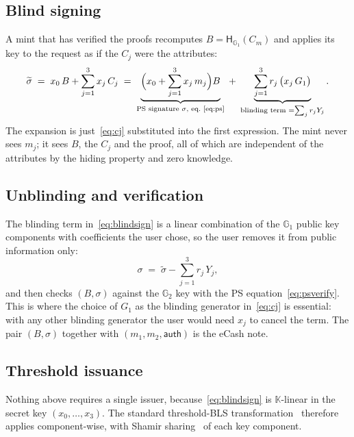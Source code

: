 \documentclass[10pt,a5paper]{article}
\newcommand{\K}[1]{#1}                      %
\newcommand{\Go}[1]{#1}                     %
\newcommand{\K}[1]{{\color{ScalarCol}#1}}   %
\newcommand{\Go}[1]{{\color{GoneCol}#1}}    %
\newcommand{\F}{\mathbb{K}}
\newcommand{\GG}[1]{\mathbb{G}_{#1}}
\newcommand{\Hg}{\mathsf{H}_{\GG{1}}}
\newcommand{\auth}{\mathsf{auth}}
\begin{document}
\subsection{Blind signing}
\label{sec:blindsign}

A mint that has verified the proofs recomputes $\Go{B} = \Hg(\Go{C_m})$ and
applies its key to the request as if the $\Go{C_j}$ were the attributes:
\begin{equation}
  \Go{\widetilde{\sigma}}
  \;=\; \K{x_0}\,\Go{B} + \sum_{j=1}^{3} \K{x_j}\,\Go{C_j}
  \;=\; \underbrace{\Bigl(\K{x_0} + \sum_{j=1}^{3} \K{x_j}\,\K{m_j}\Bigr)\Go{B}}_{\text{PS signature } \Go{\sigma}\text{, eq.~\eqref{eq:ps}}}
      \;+\; \underbrace{\sum_{j=1}^{3} \K{r_j}\,\bigl(\K{x_j}\,\Go{G_1}\bigr)}_{\text{blinding term } = \sum_j \K{r_j}\Go{Y_j}} .
  \label{eq:blindsign}
\end{equation}
The expansion is just~\eqref{eq:cj} substituted into the first expression. The
mint never sees $\K{m_j}$; it sees $\Go{B}$, the $\Go{C_j}$ and the proof, all
of which are independent of the attributes by the hiding property and zero
knowledge.

\subsection{Unblinding and verification}
\label{sec:unblind}

The blinding term in~\eqref{eq:blindsign} is a linear combination of the
$\GG{1}$ public key components with coefficients the user chose, so the user
removes it from public information only:
\begin{equation}
  \Go{\sigma} \;=\; \Go{\widetilde{\sigma}} - \sum_{j=1}^{3} \K{r_j}\,\Go{Y_j},
  \label{eq:unblind}
\end{equation}
and then checks $(\Go{B},\Go{\sigma})$ against the $\GG{2}$ key with the PS
equation~\eqref{eq:psverify}. This is where the choice of $\Go{G_1}$ as the
blinding generator in~\eqref{eq:cj} is essential: with any other blinding
generator the user would need $\K{x_j}$ to cancel the term. The pair
$(\Go{B},\Go{\sigma})$ together with $(\K{m_1},\K{m_2},\auth)$ is the eCash note.

\subsection{Threshold issuance}
\label{sec:threshold}

Nothing above requires a single issuer, because~\eqref{eq:blindsign} is
$\F$-linear in the secret key $(\K{x_0},\dots,\K{x_3})$. The standard
threshold-BLS transformation~\cite{boldyreva03} therefore applies
component-wise, with Shamir sharing~\cite{shamir79} of each key component.
\end{document}
